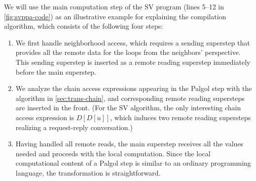 \documentclass{sokendai_thesis} %
\begin{document}
We will use the main computation step of the SV program (lines 5--12 in \autoref{fig:svppa-code}) as an illustrative example for explaining the compilation algorithm, which consists of the following four steps:
\begin{enumerate}

\item We first handle neighborhood access, which requires a sending superstep that provides all the remote data for the loops from the neighbors' perspective. %
This sending superstep is inserted as a remote reading superstep immediately before the main superstep.

\item We analyze the chain access expressions appearing in the Palgol step with the algorithm in \autoref{sec:trans-chain}, and corresponding remote reading supersteps are inserted in the front.
(For the SV algorithm, the only interesting chain access expression is $D[D[u]]$, which induces two remote reading supersteps realizing a request-reply conversation.)


\item Having handled all remote reads, the main superstep receives all the values needed and proceeds with the local computation.
Since the local computational content of a Palgol step is similar to an ordinary programming language, the transformation is straightforward.


\end{enumerate}
\end{document}

